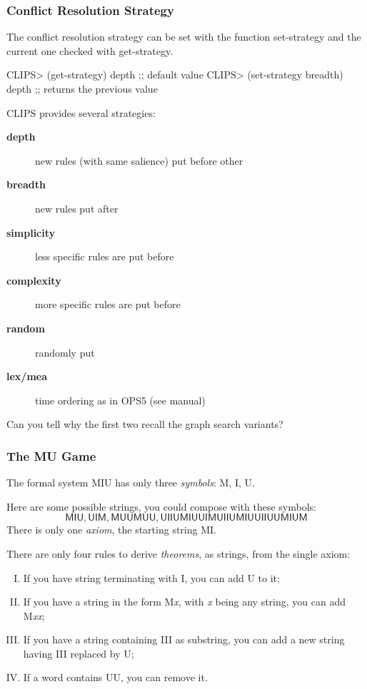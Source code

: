 \documentclass[xcolor={usenames,dvipsnames,svgnames}, compress]{beamer}
\begin{document}
\begin{frame}[fragile]
  \frametitle{Conflict Resolution Strategy}
  The conflict resolution strategy can be set with the function
  \textsf{set-strategy} and the current one checked with \textsf{get-strategy}.
  \begin{clips-code}
    CLIPS> (get-strategy)
    depth ;; default value
    CLIPS> (set-strategy breadth)
    depth ;; returns the previous value
  \end{clips-code}
  CLIPS provides several strategies:
  \begin{description}
  \item[\textbf{depth}] new rules (with same salience) put before other
  \item[\textbf{breadth}] new rules put after
  \item[\textbf{simplicity}] less specific rules are put before
  \item[\textbf{complexity}] more specific rules are put before
  \item[\textbf{random}] randomly put
  \item[\textbf{lex/mea}] time ordering as in OPS5 (see manual)
   \end{description}
  Can you tell why the first two recall the graph search variants?
\end{frame}


\begin{frame}
  \frametitle{The MU Game}
  The formal system \textsf{MIU} has only three \emph{symbols}: \textsf{M},
  \textsf{I}, \textsf{U}.\par
  Here are some possible strings,
  you could compose with these symbols:
   $$\textsf{MIU}, \textsf{UIM}, \textsf{MUUMUU}, \textsf{UIIUMIUUIMUIIUMIUUIIUUMIUM}$$
   There is only one \emph{axiom}, the starting string
   \textsf{MI}.\par\bigskip
   
   There are only four rules to derive \emph{theorems}, as strings, from the
   single axiom:
   \begin{enumerate}[I.]
   \item If you have string terminating with \textsf{I}, you can add
     \textsf{U} to it;
   \item If you have a string in the form \textsf{M}\emph{x}, with \emph{x} being
       any string, you can add \textsf{M}\emph{xx};
     \item If you have a string containing \textsf{III} as substring,
       you can add a new string having \textsf{III} replaced by
       \textsf{U};
       \item If a word contains \textsf{UU}, you can remove it.
   \end{enumerate}\bigskip
\end{frame}
\end{document}
